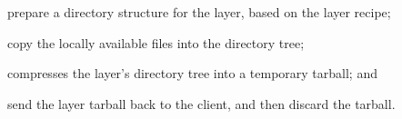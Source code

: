 \begin{compactenumerate}
	\item prepare a directory structure for the layer, based on the layer recipe;
	\item copy the locally available files into the directory tree; 
	\item compresses the layer's directory tree into a temporary tarball; and
	\item send the layer tarball back to the client, and then discard the tarball.
\end{compactenumerate}



